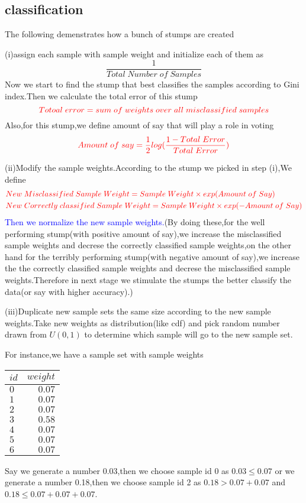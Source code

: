 \documentclass{article}
\begin{document}
\subsection{classification}
The following demenstrates how a bunch of stumps are created

(i)assign each sample with sample weight and initialize each of them as$$\frac{1}{Total\;Number\;of\;Samples}$$Now we start to find the stump that best classifies the samples according to Gini index.Then we calculate the total error of this stump$$\textcolor{red}{Totoal\;error=sum\;of\;weights\;over\;all\;misclassified\;samples}$$Also,for this stump,we define amount of say that will play a role in voting$$\textcolor{red}{Amount\;of\;say=\frac{1}{2}log(\frac{1-Total\;Error}{Total\;Error})}$$

(ii)Modify the sample weights.According to the stump we picked in step (i),We define
\begin{align*}
	&\textcolor{red}{New\;Misclassified\;Sample\;Weight=Sample\;Weight\times exp(Amount\;of\;Say)}\\
	&\textcolor{red}{New\;Correctly\;classified\;Sample\;Weight=Sample\;Weight\times exp(-Amount\;of\;Say)}
\end{align*}
\textcolor{blue}{Then we normalize the new sample weights.}(By doing these,for the well performing stump(with positive amount of say),we increase the misclassified sample weights and decrese the correctly classified sample weights,on the other hand for the terribly performing stump(with negative amount of say),we increase the  the correctly classified sample weights and decrese the misclassified sample weights.Therefore in next stage we stimulate the stumps the better classify the data(or say with higher accuracy).)

(iii)Duplicate new sample sets the same size according to the new sample weights.Take new weights as distribution(like cdf) and pick random number drawn from $U(0,1)$ to determine which sample will go to the new sample set.

For instance,we have a sample set with sample weights
\begin{center}
\begin{tabular}{|l|r|}
	\hline
	$id$&$weight$\\ \hline
	$0$&$0.07$\\ \hline
	$1$&$0.07$\\ \hline
	$2$&$0.07$\\ \hline
	$3$&$0.58$\\ \hline
	$4$&$0.07$\\ \hline
	$5$&$0.07$\\ \hline
	$6$&$0.07$\\ \hline
\end{tabular}
\end{center}
Say we generate a number 0.03,then we choose sample id 0 as $0.03\leq0.07$ or we generate a number 0.18,then we choose sample id 2 as $0.18>0.07+0.07$ and $0.18\leq0.07+0.07+0.07$.
\end{document}
